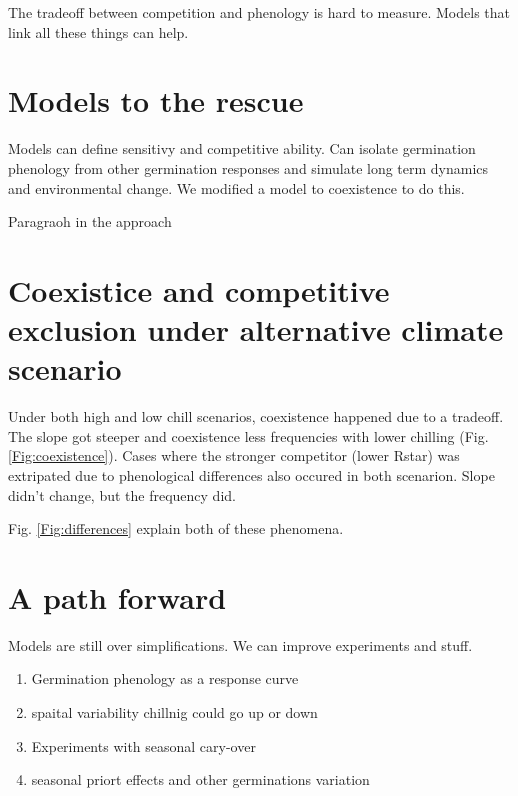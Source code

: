 \documentclass{article}[12pt]
\begin{document}
\begin{enumerate}
The tradeoff between competition and phenology is hard to measure. Models that link all these things can help.









\section{Models to the rescue}
Models can define sensitivy and competitive ability. Can isolate germination phenology from other germination responses and simulate long term dynamics and environmental change. We modified a model to coexistence to do this.

Paragraoh in the approach

\section{Coexistice and competitive exclusion under alternative climate scenario}
Under both high and low chill scenarios, coexistence happened due to a tradeoff. The slope got steeper and coexistence less frequencies with lower chilling (Fig. \ref{Fig:coexistence}). Cases where the stronger competitor (lower Rstar) was extripated due to phenological differences also occured in both scenarion. Slope didn't change, but the frequency did.

Fig. \ref{Fig:differences} explain both of these phenomena.


\section{A path forward}
Models are still over simplifications. We can improve experiments and stuff.
\begin{enumerate}
\item Germination phenology as a response curve
\item spaital variability chillnig could go up or down
\item Experiments with seasonal cary-over
\item seasonal priort effects and other germinations variation


\end{enumerate}
\end{enumerate}
\end{document}
